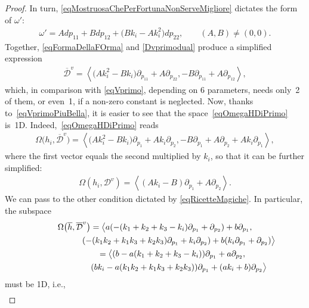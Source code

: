 \documentclass[pdftex]{sigma}
\newcommand{\D}{\mathcal{D}}
\newcommand{\Span}[1]{\left\langle #1 \right\rangle}
\numberwithin{equation}{section}
\begin{document}
\begin{proof}
In turn, \eqref{eqMostruosaChePerFortunaNonServeMigliore} dictates the form of
 $\omega'$:
\begin{gather}\label{eqFormaDellaFOrma}
\omega'=Adp_{11}+Bdp_{12}+\big(Bk_i-Ak_i^2\big)dp_{22}, \qquad (A,B)\neq (0,0).
\end{gather}
Together, \eqref{eqFormaDellaFOrma} and \eqref{Dvprimodual} produce a simplif\/ied expression
\begin{gather}\label{eqVprimoPiuBella}
 \overline{\D}^v=\Span{\big(Ak_i^2-Bk_i\big)\partial_{p_{11}}+A\partial_{p_{22}}, -B\partial_{p_{11}}+A\partial_{p_{12}}},
\end{gather}
which, in comparison with \eqref{eqVprimo}, depending on 6 parameters, needs only~2 of them, or even~1, if a non-zero constant is neglected.
Now, thanks to~\eqref{eqVprimoPiuBella}, it is easier to see that the space~\eqref{eqOmegaHDiPrimo} is~1D. Indeed,~\eqref{eqOmegaHDiPrimo} reads
\begin{gather*}
 \Omega\big(h_i,\overline{\D}^v\big) = \Span{\big(Ak_i^2-Bk_i\big)\partial_{p_{1}}+Ak_i\partial_{p_{2}},-B\partial_{p_{1}}+A\partial_{p_{2}}+Ak_i\partial_{p_{1}}},
\end{gather*}
where the f\/irst vector equals the second multiplied by $k_i$, so that it can be further simplif\/ied:
\begin{gather}\label{eqCheServiraDopo}
 \Omega(h_i, {\D}^v) = \Span{( Ak_i-B)\partial_{p_{1}}+A\partial_{p_{2}} }.
\end{gather}
We can pass to the other condition dictated by \eqref{eqRicetteMagiche}. In particular, the subspace
\begin{gather}
 \Omega\big(\overline{h},\overline{\D}^v\big) = \big\langle a (-(k_1+k_2+k_3-k_i) \partial_{p_{1}} + \partial_{p_{2}}) + b \partial_{p_{1}},\nonumber\\
\hphantom{\Omega\big(\overline{h},\overline{\D}^v\big) = \big\langle}{}
 (-(k_1k_2+k_1k_3+k_2k_3)\partial_{p_{1}}+k_i \partial_{p_{2}}) + b ( k_i \partial_{p_{1}}+ \partial_{p_{2}})\big\rangle\nonumber\\
\hphantom{\Omega\big(\overline{h},\overline{\D}^v\big) }{} = \big\langle (b-a(k_1+k_2+k_3-k_i)) \partial_{p_{1}} + a\partial_{p_{2}} ,\nonumber\\
\hphantom{\Omega\big(\overline{h},\overline{\D}^v\big) = \big\langle}{} (bk_i-a(k_1k_2+k_1k_3+k_2k_3))\partial_{p_{1}}+(ak_i+b) \partial_{p_{2}} \big\rangle\label{eqPrimoGeneratore}
\end{gather}
must be 1D, i.e.,
\begin{gather}\label{eqConProduttoria}

\end{gather}
\end{proof}
\end{document}
